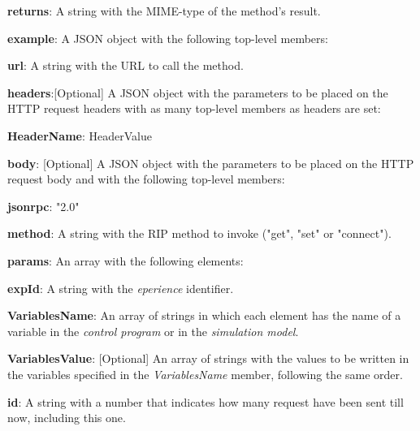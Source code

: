 \begin{myEnumerate}
\begin{myEnumerate}
\begin{myEnumerate}
\begin{myEnumerate}
            \end{myEnumerate}
            \item \textbf{returns}: A string with the MIME-type of the method's result.
            \item \textbf{example}: A JSON object with the following top-level members:
            \begin{myEnumerate}
                    \item \textbf{url}: A string with the URL to call the method.
                    \item \textbf{headers}:[Optional] A JSON object with the parameters to be placed on the HTTP request headers with as many top-level members as headers are set:
                    \begin{myEnumerate}
                        \item \textbf{HeaderName}: HeaderValue
                    \end{myEnumerate}
                    \item \textbf{body}: [Optional] A JSON object with the parameters to be placed on the HTTP request body and with the following top-level members:
                    \begin{myEnumerate}
                        \item \textbf{jsonrpc}: "2.0"
                        \item \textbf{method}: A string with the RIP method to invoke ("get", "set" or "connect"). %
                        \item \textbf{params}: An array with the following elements:
                        \begin{myEnumerate}
                            \item \textbf{expId}: A string with the \textit{eperience} identifier.
                            \item \textbf{VariablesName}: An array of strings in which each element has the name of a variable in the \textit{control program} or in the \textit{simulation model}.
                            \item \textbf{VariablesValue}: [Optional] An array of strings with the values to be written in the variables specified in the \textit{VariablesName} member, following the same order.
                        \end{myEnumerate}
                        \item \textbf{id}: A string with a number that indicates how many request have been sent till now, including this one.

\end{myEnumerate}
\end{myEnumerate}
\end{myEnumerate}
\end{myEnumerate}
\end{myEnumerate}
